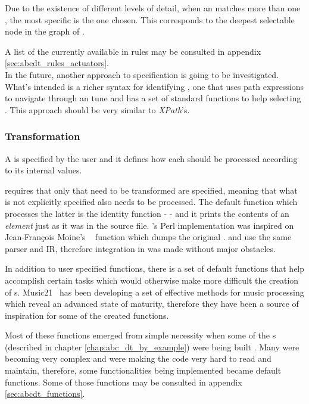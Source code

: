 Due to the existence of different levels of detail, when an \abcelement{} matches more than one
\actuator{}, the most specific is the one chosen. This corresponds to the deepest selectable node in
the graph of \actuators{}.

A list of the currently available \actuators{} in \abcdt{} rules may be consulted in appendix
\ref{sec:abcdt_rules_actuators}.\\

In the future, another approach to \actuators{} specification is going to be investigated. What's
intended is a richer syntax for identifying \abcelements{}, one that uses path expressions to
navigate through an \abc{} tune and has a set of standard functions to help selecting
\abcelements{}. This approach should be very similar to \emph{XPath}'s\cite{XPath:Online}.

\subsubsection{Transformation}

A \transformation{} is specified by the user and it defines how each \abcelement{} should be
processed according to its internal values.

\abcdt{} requires that only \abcelements{} that need to be transformed are specified, meaning that
what is not explicitly specified also needs to be processed. The default function which processes
the latter is the identity function - \toabc{} - and it prints the contents of an \emph{element}
just as it was in the \abc{} source file. \toabc{}'s Perl implementation was inspired on
Jean-François Moine's \tclabc{}~\cite{tclabc:Online} \symdumpi{} function which dumps the original
\abcelement{}.  \abcmtops{} and \tclabc{} use the same parser and \ac{IR}, therefore \symdumpi{}
integration in \abcdt{} was made without major obstacles.

In addition to user specified functions, there is a set of default functions that help accomplish
certain tasks which would otherwise make more difficult the creation of \abcpt{}s.
Music21~\cite{music21:Online} has been developing a set of effective methods for music processing
which reveal an advanced state of maturity, therefore they have been a source of inspiration for
some of the created functions.

Most of these functions emerged from simple necessity when some of the \abcpt{}s (described in
chapter \ref{chap:abc_dt_by_example}) were being built . Many \transformations{} were becoming very
complex and were making the code very hard to read and maintain, therefore, some functionalities
being implemented became \abcdt{} default functions. Some of those functions may be consulted in
appendix \ref{sec:abcdt_functions}.

